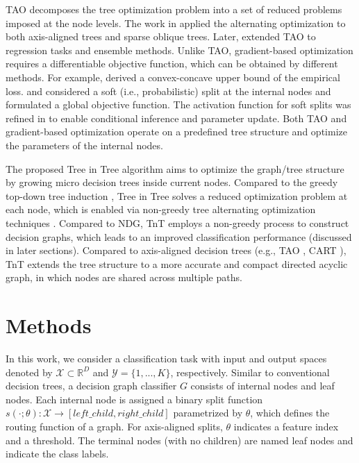 \documentclass{article}
\begin{document}
TAO decomposes the tree optimization problem into a set of reduced problems imposed at the node levels. The work in \cite{carreira2018alternating} applied the alternating optimization to both axis-aligned trees and sparse oblique trees. Later, \cite{zharmagambetov2020smaller} extended TAO to regression tasks and ensemble methods. Unlike TAO, gradient-based optimization requires a differentiable objective function, which can be obtained by different methods. For example, \cite{norouzi2015efficient} derived a convex-concave upper bound of the empirical loss. \cite{kontschieder2015deep} and \cite{zhu2020resot} considered a soft (i.e., probabilistic) split at the internal nodes and formulated a global objective function. The activation function for soft splits was refined in \cite{hazimeh2020tree} to enable conditional inference and parameter update. Both TAO and gradient-based optimization operate on a predefined tree structure and optimize the parameters of the internal nodes.

The proposed Tree in Tree algorithm aims to optimize the graph/tree structure by growing micro decision trees inside current nodes. Compared to the greedy top-down tree induction \cite{steinberg2009cart}, Tree in Tree solves a reduced optimization problem at each node, which is enabled via non-greedy tree alternating optimization techniques \cite{carreira2018alternating}. Compared to NDG, TnT employs a non-greedy process to construct decision graphs, which leads to an improved classification performance (discussed in later sections). Compared to axis-aligned decision trees (e.g., TAO \cite{carreira2018alternating, zharmagambetov2020smaller}, CART \cite{steinberg2009cart}), TnT extends the tree structure to a more accurate and compact directed acyclic graph, in which nodes are shared across multiple paths.


\vspace{-0mm}
\section{Methods} \vspace{-0mm}
In this work, we consider a classification task with input and output spaces denoted by $ \mathcal{X} \subset \mathbb{R}^{D}$ and $\mathcal{Y} = \{1,...,K\}$, respectively. Similar to conventional decision trees, a decision graph classifier $G$ consists of internal nodes and leaf nodes. Each internal node is assigned a binary split function $s(\cdot ; \theta): \mathcal{X} \rightarrow[left\_child,right\_child]$ parametrized by $\theta$, which defines the routing function of a graph. For axis-aligned splits, $\theta$ indicates a feature index and a threshold. 
The terminal nodes (with no children) are named leaf nodes and indicate the class labels.
\end{document}
